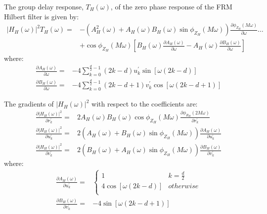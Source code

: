 \documentclass[a4paper,twoside,10pt,english]{report}
\begin{document}
The group delay response, $T_{H}\left(\omega\right)$, of the zero phase response 
of the FRM Hilbert filter is given by:
\begin{align*}
  \left|H_{H}\left(\omega\right)\right|^{2}T_{H}\left(\omega\right)
  =& -\left(A_{H}^{2}\left(\omega\right)+
     A_{H}\left(\omega\right)B_{H}\left(\omega\right)
     \sin\phi_{Z_{H}}\left(M\omega\right)\right)
     \frac{\partial\phi_{Z_{H}}\left(M\omega\right)}{\partial\omega} \hdots \\
   & +\cos\phi_{Z_{H}}\left(M\omega\right)\left[
     B_{H}\left(\omega\right)
     \frac{\partial A_{H}\left(\omega\right)}{\partial\omega}-
     A_{H}\left(\omega\right)
     \frac{\partial B_{H}\left(\omega\right)}{\partial\omega}
     \right]
\end{align*}
where:
\begin{align*}
  \frac{\partial A_{H}\left(\omega\right)}{\partial\omega} =
  & -4\sum_{k=0}^{\frac{d}{2}-1}\left(2k-d\right)u^{\prime}_{k}
    \sin\left[\omega{}\left(2k-d\right)\right] \\
  \frac{\partial B_{H}\left(\omega\right)}{\partial\omega} =
  & -4\sum_{k=0}^{\frac{d}{2}-1}
    \left(2k-d+1\right)v^{\prime}_{k}\cos\left[\omega{}\left(2k-d+1\right)\right]
\end{align*}

The gradients of $\left|H_{H}\left(\omega\right)\right|^{2}$ with respect to
the coefficients are:
\begin{align*}
  \frac{\partial\left|H_{H}\left(\omega\right)\right|^{2}}{\partial r^{\prime}_{k}}=
  &2A_{H}\left(\omega\right)B_{H}\left(\omega\right)
    \cos\phi_{Z_{H}}\left(M\omega\right)
    \frac{\partial \phi_{R_{H}}\left(2M\omega\right)}{\partial r^{\prime}_{k}} \\
  \frac{\partial\left|H_{H}\left(\omega\right)\right|^{2}}{\partial u^{\prime}_{k}}=
  &2\left(A_{H}\left(\omega\right)+
    B_{H}\left(\omega\right)\sin\phi_{Z_{H}}\left(M\omega\right)\right)
    \frac{\partial A_{H}\left(\omega\right)}{\partial u^{\prime}_{k}}\\
  \frac{\partial\left|H_{H}\left(\omega\right)\right|^{2}}{\partial v^{\prime}_{k}}=
  &2\left(B_{H}\left(\omega\right)+
    A_{H}\left(\omega\right)\sin\phi_{Z_{H}}\left(M\omega\right)\right)
    \frac{\partial B_{H}\left(\omega\right)}{\partial v^{\prime}_{k}}
\end{align*}
where:
\begin{align*}
  \frac{\partial A_{H}\left(\omega\right)}{\partial u^{\prime}_{k}} =
  & \begin{cases}
    1 & k=\frac{d}{2} \\
    4\cos\left[\omega{}\left(2k-d\right)\right] & otherwise \\
    \end{cases}\\
  \frac{\partial B_{H}\left(\omega\right)}{\partial v^{\prime}_{k}} =
  &-4\sin\left[\omega{}\left(2k-d+1\right)\right]
\end{align*}
\end{document}
